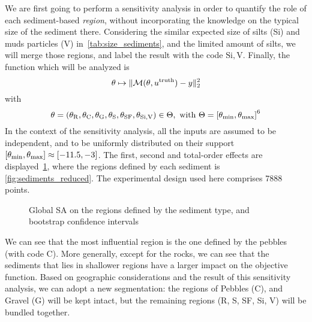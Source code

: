 \documentclass[../../Main_ManuscritThese.tex]{subfiles}
\newcommand\imgpath{/home/victor/acadwriting/Manuscrit/Text/Chapter5/img/}
\begin{document}
We are first going to perform a sensitivity analysis in order to
quantify the role of each sediment-based \emph{region}, without
incorporating the knowledge on the typical size of the sediment there.
Considering the similar expected size of silts (Si) and muds particles
(V) in~\cref{tab:size_sediments}, and the limited amount of silts, we
will merge those regions, and label the result with the code
$\mathrm{Si,V}$. Finally, the function which will be analyzed is
\begin{equation}
\theta \mapsto \|\mathcal{M}(\theta, u^{\mathrm{truth}}) - y \|_2^2
\end{equation}
with
\begin{equation}
  \kk = (\kk_{\mathrm{R}},\kk_{\mathrm{C}},\kk_{\mathrm{G}},\kk_{\mathrm{S}},
  \kk_{\mathrm{SF}},\kk_{\mathrm{Si,V}})\in\Kspace, \text{ with }
  \Kspace = \interval{\kk_{\min}}{\kk_{\max}}^6
\end{equation}
In the context of the sensitivity analysis, all the inputs are assumed
to be independent, and to be uniformly distributed on their support
$\interval{\kk_{\min}}{\kk_{\max}}\approx
\interval{\num{-11.5}}{\num{-3}}$.  The first, second and total-order
effects are displayed~\cref{fig:SA_sediments}, where the regions
defined by each sediment is \cref{fig:sediments_reduced}. The
experimental design used here comprises \num{7888} points.

\label{ssec:SA_sediments}
\begin{figure}[ht]
  \centering
  
  \caption[SA on the sediments-based regions]{\label{fig:SA_sediments} Global SA on the regions defined by the sediment type, and bootstrap confidence intervals}
\end{figure}

We can see that the most influential region is the one defined by the
pebbles (with code C). More generally, except for the rocks, we can
see that the sediments that lies in shallower regions have a larger
impact on the objective function.  Based on geographic considerations
and the result of this sensitivity analysis, we can adopt a new
segmentation: the regions of Pebbles (C), and Gravel (G) will be kept
intact, but the remaining regions (R, S, SF, Si, V) will be bundled
together.
\end{document}
